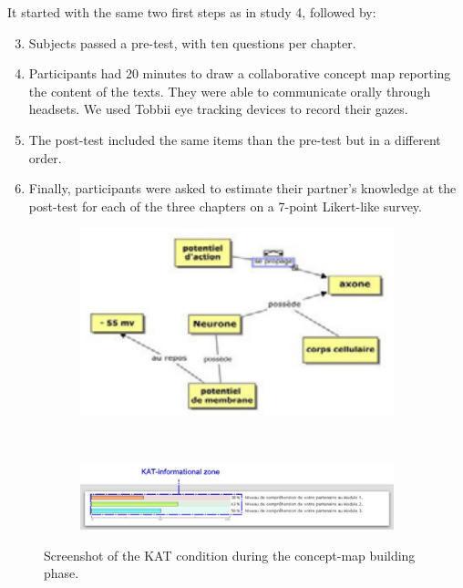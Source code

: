 \documentclass[natbib]{svjour3}
\begin{document}
It started with the same two first steps as in study 4, followed by:

\begin{enumerate}
    \setcounter{enumi}{2}

    \item Subjects passed a pre-test, with ten questions per chapter. 

    \item Participants had 20 minutes to draw a collaborative concept map
        reporting the content of the texts. They were able to communicate
        orally through headsets.  We used Tobbii eye tracking devices to
        record their gazes.

    \item The post-test included the same items than the pre-test but in a
        different order. 

    \item  Finally, participants were asked to estimate their partner's
        knowledge at the post-test for each of the three chapters on a 7-point
        Likert-like survey. 

\end{enumerate}

\begin{figure}[h!t]
        \centering
        \begin{subfigure}{.6\textwidth}
            \includegraphics[width=\linewidth]{study5-conceptmap.png}
        \end{subfigure} \\
        \begin{subfigure}{.7\textwidth}
            \includegraphics[width=\linewidth]{study5-kat.png}
        \end{subfigure}
        \caption{Screenshot of the KAT condition during the concept-map building
        phase.}
        \label{study5:kat}
\end{figure}
\end{document}
